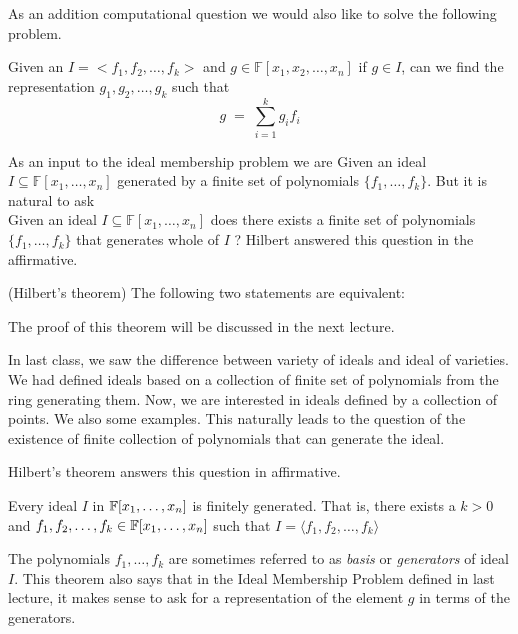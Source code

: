 As an addition computational question we would also like to solve the following problem.


Given an $I = <f_1,f_2, \ldots, f_k>$ and $g \in \mathbb{F}[x_1,x_2,\ldots,x_n]$ if $g\in I$, can we find the representation $g_1,g_2,\ldots,g_k$ such that $$
	g\;=\;\sum_{i=1}^k g_if_i
$$

As an input to the ideal membership problem we are 
Given an ideal $I\subseteq\mathbb{F}[x_1,\ldots,x_n]$ generated by a finite set of polynomials $\{f_1,\ldots,f_k\}$. But it is natural to ask \\
Given an ideal $I\subseteq\mathbb{F}[x_1,\ldots,x_n]$ does there exists a finite set of polynomials $\{f_1,\ldots,f_k\}$ that generates whole of $I$ ? Hilbert answered this question in the affirmative.


\begin{theorem}(Hilbert's theorem)
The following two statements are equivalent:
\end{theorem}
The proof of this theorem will be discussed in the next lecture.

In last class, we saw the difference between variety of ideals and ideal of
varieties. We had defined ideals based on a collection of finite set of
polynomials from the ring generating them. Now, we are interested in
ideals defined by a collection of points. We also some examples. This
naturally leads to the question of the existence of finite collection of
polynomials that can generate the ideal.

Hilbert's theorem answers this question in affirmative.
\begin{theorem}
	Every ideal $I$ in ${\mathbb{F}}[x_1,\ldots,x_n]$ is finitely generated. That
	is, there exists a $k > 0$ and $f_1,f_2,\ldots,f_k \in
	{\mathbb{F}}[x_1,\ldots,x_n]$ such that $I = \langle f_1,f_2,\ldots,f_k \rangle
	$
	\label{thm:hbt}
\end{theorem}
The polynomials $f_1,\ldots,f_k$ are sometimes referred to as \emph{basis} or
\emph{generators} of ideal $I$. This theorem also says that in the Ideal
Membership Problem defined in last
lecture, it makes sense to ask for a representation of the element $g$ in
terms of the generators. 

